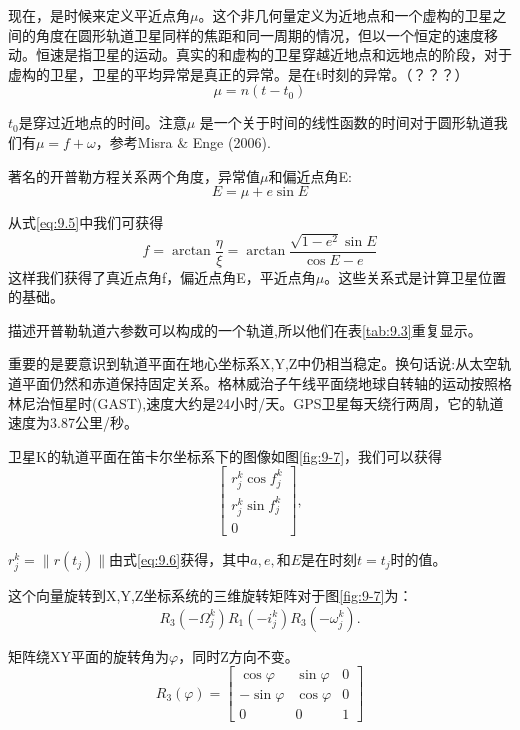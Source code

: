 	现在，是时候来定义平近点角$\mu$。这个非几何量定义为近地点和一个虚构的卫星之间的角度在圆形轨道卫星同样的焦距和同一周期的情况，但以一个恒定的速度移动。恒速是指卫星的运动。真实的和虚构的卫星穿越近地点和远地点的阶段，对于虚构的卫星，卫星的平均异常是真正的异常。是在t时刻的异常。（？？？）
	$$\mu = n(t-t_0)$$
	
	$t_0$是穿过近地点的时间。注意$\mu$ 是一个关于时间的线性函数的时间对于圆形轨道我们有$\mu = f + \omega$，参考Misra $\&$ Enge (2006).
	
	著名的开普勒方程关系两个角度，异常值$\mu$和偏近点角E:
	\begin{equation}\label{eq:9.8}
	E = \mu + e\sin E
	\end{equation}
	
	从式\ref{eq:9.5}中我们可获得
	\begin{equation}\label{eq:9.9}
	f = \arctan \frac{\eta}{\xi} = \arctan \dfrac{\sqrt{1-e^2}\sin E}{\cos E-e}
	\end{equation}
	这样我们获得了真近点角f，偏近点角E，平近点角$\mu$。这些关系式是计算卫星位置的基础。
	
	描述开普勒轨道六参数可以构成的一个轨道,所以他们在表\ref{tab:9.3}重复显示。
	
	重要的是要意识到轨道平面在地心坐标系X,Y,Z中仍相当稳定。换句话说:从太空轨道平面仍然和赤道保持固定关系。格林威治子午线平面绕地球自转轴的运动按照格林尼治恒星时(GAST),速度大约是24小时/天。GPS卫星每天绕行两周，它的轨道速度为3.87公里/秒。	
	
	卫星K的轨道平面在笛卡尔坐标系下的图像如图\ref{fig:9-7}，我们可以获得
	$$\begin{bmatrix}
	r^k_j\cos f^k_j \\
	r^k_j\sin f^k_j \\
	0
	\end{bmatrix},$$
	
	$r^k_j = \lVert r(t_j)\lVert$由式\ref{eq:9.6}获得，其中$a,e,$和$E$是在时刻$t = t_j$时的值。
	
	这个向量旋转到X,Y,Z坐标系统的三维旋转矩阵对于图\ref{fig:9-7}为：
	$$R_3(-\Omega^k_j)R_1(-i^k_j)R_3(-\omega ^k_j).$$
	
	矩阵绕XY平面的旋转角为$\varphi$，同时Z方向不变。
	\begin{equation}\label{eq:9.10}
	R_3(\varphi) = 
	\begin{bmatrix}
	\cos \varphi & \sin \varphi & 0 \\
	-\sin \varphi & \cos \varphi & 0 \\
	0 & 0 & 1
	\end{bmatrix}
	\end{equation}
	
